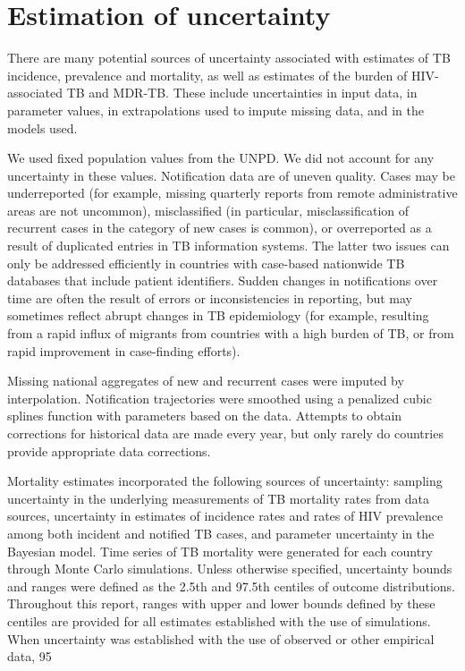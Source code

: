 \section{Estimation of uncertainty}

There are many potential sources of uncertainty associated with estimates of TB incidence, prevalence and mortality, as well as estimates of the burden of HIV-associated TB and MDR-TB. These include uncertainties in input data, in parameter values, in extrapolations used to impute missing data, and in the models used. 

We used fixed population values from the UNPD. We did not account for any uncertainty in these values.  
Notification data are of uneven quality. Cases may be underreported (for example, missing quarterly reports from remote administrative areas are not uncommon), misclassified (in particular, misclassification of recurrent cases in the category of new cases is common), or overreported as a result of duplicated entries in TB information systems. The latter two issues can only be addressed efficiently in countries with case-based nationwide TB databases that include patient identifiers. Sudden changes in notifications over time are often the result of errors or inconsistencies in reporting, but may sometimes reflect abrupt changes in TB epidemiology (for example, resulting from a rapid influx of migrants from countries with a high burden of TB, or from rapid improvement in case-finding efforts). 

Missing national aggregates of new and recurrent cases were imputed by interpolation. Notification trajectories were smoothed using a penalized cubic splines function with parameters based on the data. Attempts to obtain corrections for historical data are made every year, but only rarely do countries provide appropriate data corrections. 

Mortality estimates incorporated the following sources of uncertainty: sampling uncertainty in the underlying measurements of TB mortality rates from data sources, uncertainty in estimates of incidence rates and rates of HIV prevalence among both incident and notified TB cases, and parameter uncertainty in the Bayesian model. Time series of TB mortality were generated for each country through Monte Carlo simulations. 
Unless otherwise specified, uncertainty bounds and ranges were defined as the 2.5th and 97.5th centiles of outcome distributions. Throughout this report, ranges with upper and lower bounds defined by these centiles are provided for all estimates established with the use of simulations. When uncertainty was established with the use of observed or other empirical data, 95%
 
